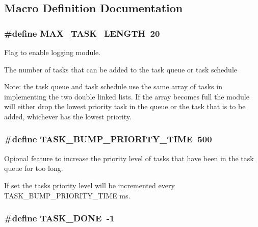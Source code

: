 \subsection{Macro Definition Documentation}
\hypertarget{group__task_ga9a4bac1b8cbff5bb6fdbcbbf7d4bbb1d}{
\subsubsection[{M\+A\+X\+\_\+\+T\+A\+S\+K\+\_\+\+L\+E\+N\+G\+T\+H}]{\setlength{\rightskip}{0pt plus 5cm}\#define M\+A\+X\+\_\+\+T\+A\+S\+K\+\_\+\+L\+E\+N\+G\+T\+H~20}}\label{group__task_ga9a4bac1b8cbff5bb6fdbcbbf7d4bbb1d}


Flag to enable logging module. 

The number of tasks that can be added to the task queue or task schedule

Note\+: the task queue and task schedule use the same array of tasks in implementing the two double linked lists. If the array becomes full the module will either drop the lowest priority task in the queue or the task that is to be added, whichever has the lowest priority. \hypertarget{group__task_gaa96ae0d55ded50eac007bcd86332da47}{
\subsubsection[{T\+A\+S\+K\+\_\+\+B\+U\+M\+P\+\_\+\+P\+R\+I\+O\+R\+I\+T\+Y\+\_\+\+T\+I\+M\+E}]{\setlength{\rightskip}{0pt plus 5cm}\#define T\+A\+S\+K\+\_\+\+B\+U\+M\+P\+\_\+\+P\+R\+I\+O\+R\+I\+T\+Y\+\_\+\+T\+I\+M\+E~500}}\label{group__task_gaa96ae0d55ded50eac007bcd86332da47}


Opional feature to increase the priority level of tasks that have been in the task queue for too long. 

If set the tasks priority level will be incremented every T\+A\+S\+K\+\_\+\+B\+U\+M\+P\+\_\+\+P\+R\+I\+O\+R\+I\+T\+Y\+\_\+\+T\+I\+M\+E ms. \hypertarget{group__task_gafdc2d62fe9a4cfe15bef8ac978e4c120}{
\subsubsection[{T\+A\+S\+K\+\_\+\+D\+O\+N\+E}]{\setlength{\rightskip}{0pt plus 5cm}\#define T\+A\+S\+K\+\_\+\+D\+O\+N\+E~-\/1}}\label{group__task_gafdc2d62fe9a4cfe15bef8ac978e4c120}


